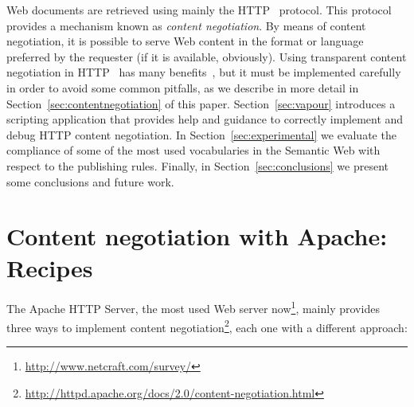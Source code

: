 \documentclass{../templates/llncs}
\begin{document}
Web documents are retrieved using mainly the HTTP~\cite{HTTP} 
protocol. This protocol provides a mechanism known as \textit{content negotiation}. 
By means of content negotiation, it is possible to serve Web content in the format or 
language preferred by the requester (if it is available, obviously). Using transparent content negotiation 
in HTTP~\cite{Holtman1998} has many benefits~\cite{Seshan1998}, but it must be 
implemented carefully in order to avoid some common pitfalls, as we describe in more detail in 
Section~\ref{sec:contentnegotiation} of this paper. Section~\ref{sec:vapour} introduces 
a scripting application that provides help and guidance to correctly implement and debug
HTTP content negotiation. In Section~\ref{sec:experimental} we evaluate the
compliance of some of the most used
vocabularies in the Semantic Web with respect to the publishing rules. Finally, in Section~\ref{sec:conclusions} we present 
some conclusions and future work.


\section{\label{sec:contentnegotiation}Content negotiation with Apache: Recipes}


The Apache HTTP Server, the most used Web server
now\footnote{\url{http://www.netcraft.com/survey/}}, 
mainly provides three ways to implement content negotiation\footnote{\url{http://httpd.apache.org/docs/2.0/content-negotiation.html}}, 
each one with a different approach:
\end{document}
